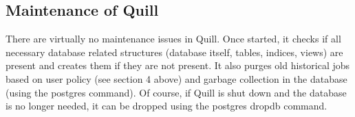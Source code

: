 \subsection{\label{sec:Quill-Maintenance}Maintenance of Quill}

There are virtually no maintenance issues in Quill.  Once started, it
checks if all necessary database related structures (database itself,
tables, indices, views) are present and creates them if they are
not present. It also purges old historical jobs based on user policy
(see section 4 above) and garbage collection in the database (using the
postgres  command).  Of course, if Quill is shut
down and the database is no longer needed, it can be dropped using the
postgres dropdb command.


